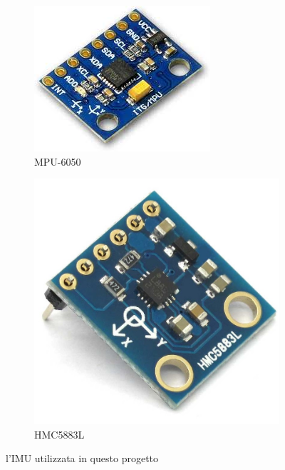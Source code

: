 \documentclass[10pt,a4paper]{article}
\begin{document}
\begin{figure}[h]
    \centering
    \begin{subfigure}[b]{0.3\textwidth}
        \includegraphics[height=0.75\textwidth]{MPU-6050.jpg}
        \caption{MPU-6050}
        \label{fig:MPU6050}
    \end{subfigure} 
    \begin{subfigure}[b]{0.3\textwidth}
        \includegraphics[height=0.75\textwidth]{HMC5883L.jpg}
        \caption{HMC5883L}
        \label{fig:HMC5883L}
    \end{subfigure}
    \caption{l'IMU utilizzata in questo progetto}
    \label{fig:imu}
\end{figure}
\end{document}
